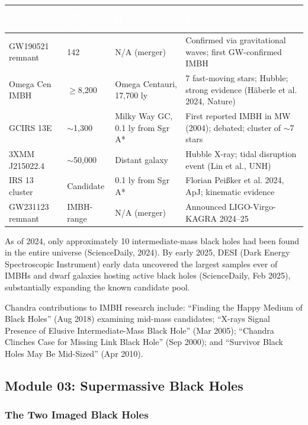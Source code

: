 \documentclass[11pt,letterpaper]{article}
\newcommand{\tableheader}[1]{\textbf{\sffamily\textcolor{white}{#1}}}
\begin{document}
\begin{center}
\begin{tabularx}{\textwidth}{L{3cm}C{2cm}L{3.2cm}X}
\toprule
{}
\tableheader{Object} & \tableheader{Mass ($M_\odot$)} & \tableheader{Host} & \tableheader{Evidence \& Status} \\
\midrule
GW190521 remnant & 142 & N/A (merger) & Confirmed via gravitational waves; first GW-confirmed IMBH \\
Omega Cen IMBH & $\geq$8,200 & Omega Centauri, 17,700 ly & 7 fast-moving stars; Hubble; strong evidence (Häberle et al. 2024, Nature) \\
GCIRS 13E & $\sim$1,300 & Milky Way GC, 0.1 ly from Sgr A* & First reported IMBH in MW (2004); debated; cluster of $\sim$7 stars \\
3XMM J215022.4 & $\sim$50,000 & Distant galaxy & Hubble X-ray; tidal disruption event (Lin et al., UNH) \\
IRS 13 cluster & Candidate & 0.1 ly from Sgr A* & Florian Peißker et al. 2024, ApJ; kinematic evidence \\
GW231123 remnant & IMBH-range & N/A (merger) & Announced LIGO-Virgo-KAGRA 2024--25 \\
\bottomrule
\end{tabularx}
\end{center}

As of 2024, only approximately 10 intermediate-mass black holes had been found in the entire universe (ScienceDaily, 2024). By early 2025, DESI (Dark Energy Spectroscopic Instrument) early data uncovered the largest samples ever of IMBHs and dwarf galaxies hosting active black holes (ScienceDaily, Feb 2025), substantially expanding the known candidate pool.

Chandra contributions to IMBH research include: ``Finding the Happy Medium of Black Holes'' (Aug 2018) examining mid-mass candidates; ``X-rays Signal Presence of Elusive Intermediate-Mass Black Hole'' (Mar 2005); ``Chandra Clinches Case for Missing Link Black Hole'' (Sep 2000); and ``Survivor Black Holes May Be Mid-Sized'' (Apr 2010).

\subsection{Module 03: Supermassive Black Holes}

\subsubsection{The Two Imaged Black Holes}
\end{document}
